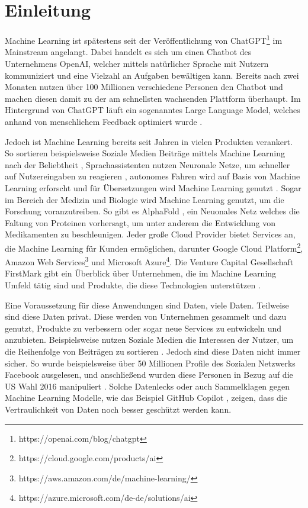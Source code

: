 \chapter{Einleitung}\label{sec:introduction}

Machine Learning ist spätestens seit der Veröffentlichung von ChatGPT\footnote{https://openai.com/blog/chatgpt} im Mainstream angelangt. 
Dabei handelt es sich um einen Chatbot des Unternehmens OpenAI, welcher mittels natürlicher Sprache mit Nutzern kommuniziert und eine Vielzahl an Aufgaben bewältigen kann.
Bereits nach zwei Monaten nutzen über 100 Millionen verschiedene Personen den Chatbot und machen diesen damit zu der am schnellsten wachsenden Plattform überhaupt.
Im Hintergrund von ChatGPT läuft ein sogenanntes Large Language Model, welches anhand von menschlichem Feedback optimiert wurde \cite{P-84}. 

Jedoch ist Machine Learning bereits seit Jahren in vielen Produkten verankert.
So sortieren beispielsweise Soziale Medien Beiträge mittels Machine Learning nach der Beliebtheit \cite{twitter_algo}, Sprachassistenten nutzen Neuronale Netze, um schneller auf Nutzereingaben zu reagieren \cite{siri}, autonomes Fahren wird auf Basis von Machine Learning erforscht \cite{openpilot} und für Übersetzungen wird Machine Learning genutzt \cite{translation}.
Sogar im Bereich der Medizin und Biologie wird Machine Learning genutzt, um die Forschung voranzutreiben. 
So gibt es AlphaFold \cite{AlphaFold}, ein Neuonales Netz welches die Faltung von Proteinen vorhersagt, um unter anderem die Entwicklung von Medikamenten zu beschleunigen.
Jeder große Cloud Provider bietet Services an, die Machine Learning für Kunden ermöglichen, darunter Google Cloud Platform\footnote{https://cloud.google.com/products/ai}, Amazon Web Services\footnote{https://aws.amazon.com/de/machine-learning/} und Microsoft Azure\footnote{https://azure.microsoft.com/de-de/solutions/ai}.
Die Venture Capital Gesellschaft FirstMark gibt ein Überblick über Unternehmen, die im Machine Learning Umfeld tätig sind und Produkte, die diese Technologien unterstützen \cite{I-4}.

Eine Voraussetzung für diese Anwendungen sind Daten, viele Daten.
Teilweise sind diese Daten privat.
Diese werden von Unternehmen gesammelt und dazu genutzt, Produkte zu verbessern oder sogar neue Services zu entwickeln und anzubieten. 
Beispielsweise nutzen Soziale Medien die Interessen der Nutzer, um die Reihenfolge von Beiträgen zu sortieren \cite{twitter_algo}. 
Jedoch sind diese Daten nicht immer sicher. 
So wurde beispielsweise über 50 Millionen Profile des Sozialen Netzwerks Facebook ausgelesen, und anschließend wurden diese Personen in Bezug auf die US Wahl 2016 manipuliert \cite{I-2}.
Solche Datenlecks oder auch Sammelklagen gegen Machine Learning Modelle, wie das Beispiel GitHub Copilot \cite{I-5}, zeigen, dass die Vertraulichkeit von Daten noch besser geschützt werden kann.

